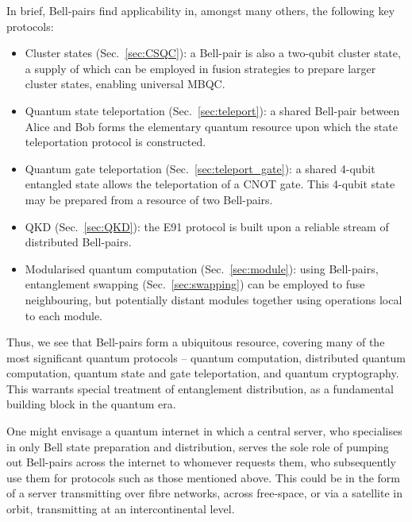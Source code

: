 \documentclass[aps, rmp, twocolumn, amsmath, amssymb, nofootinbib, superscriptaddress, longbibliography, floatfix, table-of-contents, eqsecnum]{revtex4-1}
\begin{document}
In brief, Bell-pairs find applicability in, amongst many others, the following key protocols:
\begin{itemize}
\item Cluster states (Sec.~\ref{sec:CSQC}): a Bell-pair is also a two-qubit cluster state, a supply of which can be employed in fusion strategies to prepare larger cluster states, enabling universal MBQC.
\item Quantum state teleportation (Sec.~\ref{sec:teleport}): a shared Bell-pair between Alice and Bob forms the elementary quantum resource upon which the state teleportation protocol is constructed.
\item Quantum gate teleportation (Sec.~\ref{sec:teleport_gate}): a shared 4-qubit entangled state allows the teleportation of a CNOT gate. This 4-qubit state may be prepared from a resource of two Bell-pairs.
\item QKD (Sec.~\ref{sec:QKD}): the E91 protocol is built upon a reliable stream of distributed Bell-pairs.
\item Modularised quantum computation (Sec.~\ref{sec:module}): using Bell-pairs, entanglement swapping (Sec.~\ref{sec:swapping}) can be employed to fuse neighbouring, but potentially distant modules together using operations local to each module.
\end{itemize}

Thus, we see that Bell-pairs form a ubiquitous resource, covering many of the most significant quantum protocols -- quantum computation, distributed quantum computation, quantum state and gate teleportation, and quantum cryptography. This warrants special treatment of entanglement distribution, as a fundamental building block in the quantum era.

One might envisage a quantum internet in which a central server, who specialises in only Bell state preparation and distribution, serves the sole role of pumping out Bell-pairs across the internet to whomever requests them, who subsequently use them for protocols such as those mentioned above. This could be in the form of a server transmitting over fibre networks, across free-space, or via a satellite in orbit, transmitting at an intercontinental level.
\end{document}
